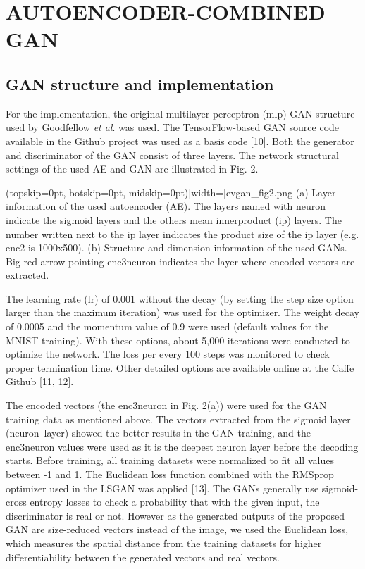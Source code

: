 \documentclass{ieeeaccess}
\begin{document}
\section{AUTOENCODER-COMBINED GAN}

\subsection{GAN structure and implementation}

For the implementation, the original multilayer perceptron (mlp) GAN structure used by Goodfellow \textit{et al}. was used. The TensorFlow-based GAN source code available in the Github project was used as a basis code [10]. Both the generator and discriminator of the GAN consist of three layers. The network structural settings of the used AE and GAN are illustrated in Fig. 2. 

\Figure[t](topskip=0pt, botskip=0pt, midskip=0pt)[width=\linewidth]{evgan_fig2.png}
{(a) Layer information of the used autoencoder (AE). The layers named with \textquotesingle neuron\textquotesingle\, indicate the sigmoid layers and the others mean innerproduct (ip) layers. The number written next to the ip layer indicates the product size of the ip layer (e.g. enc2 is 1000x500). (b) Structure and dimension information of the used GANs. Big red arrow pointing enc3neuron indicates the layer where encoded vectors are extracted.\label{fig2}}

The learning rate (lr) of 0.001 without the decay (by setting the step size option larger than the maximum iteration) was used for the optimizer. The weight decay of 0.0005 and the momentum value of 0.9 were used (default values for the MNIST training). With these options, about 5,000 iterations were conducted to optimize the network. The loss per every 100 steps was monitored to check proper termination time. Other detailed options are available online at the Caffe Github [11, 12]. 

The encoded vectors (the enc3neuron in Fig. 2(a)) were used for the GAN training data as mentioned above. The vectors extracted from the sigmoid layer (\textquotesingle neuron\textquotesingle\, layer) showed the better results in the GAN training, and the enc3neuron values were used as it is the deepest neuron layer before the decoding starts. Before training, all training datasets were normalized to fit all values between -1 and 1. The Euclidean loss function combined with the RMSprop optimizer used in the LSGAN was applied [13]. The GANs generally use sigmoid-cross entropy losses to check a probability that with the given input, the discriminator is real or not. However as the generated outputs of the proposed GAN are size-reduced vectors instead of the image, we used the Euclidean loss, which measures the spatial distance from the training datasets for higher differentiability between the generated vectors and real vectors.
\end{document}
